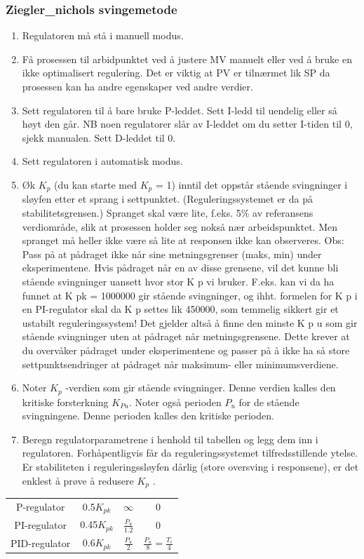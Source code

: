 \documentclass[10pt,a5paper]{article}
\begin{document}
\subsubsection{Ziegler\_nichols svingemetode}
\begin{enumerate}
\item Regulatoren må stå i manuell modus.
\item Få prosessen til arbidpunktet ved å justere MV manuelt eller ved å bruke en ikke optimalisert regulering. Det er viktig at PV er tilnærmet lik SP da prosessen kan ha andre egenskaper ved andre verdier. 
\item Sett regulatoren til å bare bruke P-leddet. Sett I-ledd til uendelig eller så høyt den går. NB noen regulatorer slår av I-leddet om du setter I-tiden til 0, sjekk  manualen. Sett D-leddet til 0. 
\item Sett regulatoren i automatisk modus.
\item Øk $K_p$ (du kan starte med $K_p$ = 1) inntil det oppstår stående svingninger
i sløyfen etter et sprang i settpunktet. (Reguleringssystemet er da
på stabilitetsgrensen.) Spranget skal være lite, f.eks. 5\% av referansens
verdiområde, slik at prosessen holder seg nokså nær arbeidspunktet.
Men spranget må heller ikke være så lite at responsen ikke kan observeres.
Obs: Pass på at pådraget ikke når sine metningsgrenser (maks, min)
under eksperimentene. Hvis pådraget når en av disse grensene,
vil det kunne bli stående svingninger uansett hvor stor K p vi bruker.
F.eks. kan vi da ha funnet at K pk = 1000000 gir stående svingninger,
og ihht. formelen for K p i en PI-regulator skal da K p settes lik
450000, som temmelig sikkert gir et ustabilt reguleringssystem! Det
gjelder altså å finne den minste K p u som gir stående svingninger
uten at pådraget når metningsgrensene. Dette krever at du overvåker
pådraget under eksperimentene og passer på å ikke ha så store settpunktsendringer
at pådraget når maksimum- eller minimumsverdiene.
\item Noter $K_p$ -verdien som gir stående svingninger. Denne verdien kalles
	den kritiske forsterkning $K_{Pu}$. Noter også perioden $P_u$ for de stående
svingningene. Denne perioden kalles den kritiske perioden.
\item Beregn regulatorparametrene i henhold til tabellen  og legg dem
inn i regulatoren. Forhåpentligvis får da reguleringssystemet tilfredsstillende
ytelse. Er stabiliteten i reguleringssløyfen dårlig (store oversving
i responsene), er det enklest å prøve å redusere $K_p$ .
\end{enumerate}
\begin{tabular}{|c|c|c|c|}
\hline 
 &  &  & \tabularnewline
\hline 
P-regulator & 0.5$K_{pk}$ & $\infty$ & 0\tabularnewline
\hline 
PI-regulator & 0.45$K_{pk}$ & $\frac{P_{u}}{1.2}$ & 0\tabularnewline
\hline 
PID-regulator & 0.6$K_{pk}$ & $\frac{P_{u}}{2}$ & $\frac{P_{u}}{8}=\frac{T_{i}}{4}$\tabularnewline
\hline 
\end{tabular}
\end{document}
